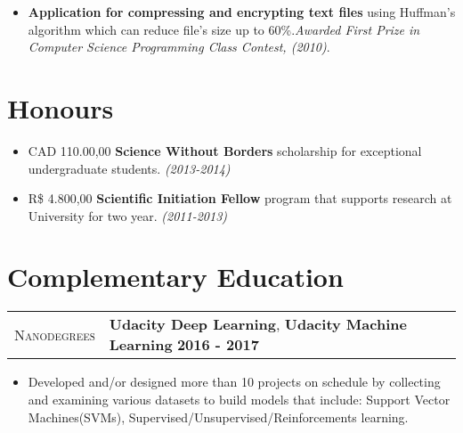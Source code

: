 \documentclass[9pt, a4paper, oneside, final]{scrartcl} %
\newcommand{\gray}{\rowcolor[gray]{.90}} %
\begin{document}
\begin{itemize}\itemsep1.0pt \parskip0pt 

\item \textbf{Application for compressing and encrypting text files} using Huffman's algorithm which can reduce file’s size up to 60\%.\textit{Awarded First Prize in Computer Science Programming Class Contest, (2010)}.


\end{itemize}

\section{Honours}

\begin{itemize}\itemsep1.0pt \parskip0pt 
\item CAD 110.00,00 \textbf{Science Without Borders} scholarship for exceptional undergraduate students. \textit{(2013-2014)}

\item R\$ 4.800,00 \textbf{Scientific Initiation Fellow} program that supports  research at University for two year.\textit{ (2011-2013)}
\end{itemize} 

\section{Complementary Education}

\begin{center}
\begin{tabularx}{1.0\linewidth}{>{\raggedleft\scshape}p{2.2cm}X}
\gray Nanodegrees & \textbf{Udacity Deep Learning}, \textbf{Udacity Machine Learning} \hfill \textbf{2016 - 2017}\\
\end{tabularx}
\end{center}

\begin{itemize}
\item Developed and/or designed more than 10 projects on schedule by collecting and examining various datasets to build models that include: Support Vector Machines(SVMs), Supervised/Unsupervised/Reinforcements learning.
\end{itemize}
\end{document}
